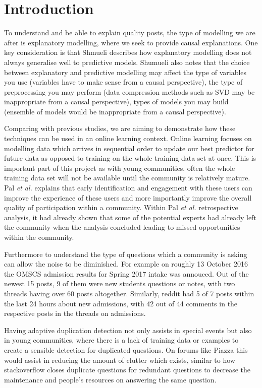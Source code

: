 \documentclass[journal,12pt,onecolumn,draftclsnofoot,]{IEEEtran}
\begin{document}
\section{Introduction}

To understand and be able to explain quality posts, the type of modelling we are after is explanatory modelling, where we seek to provide causal explanations. One key consideration is that Shmueli\cite{modpred} describes how explanatory modelling does not always generalise well to predictive models. Shumueli\cite{modpred} also notes that the choice between explanatory and predictive modelling may affect the type of variables you use (variables have to make sense from a causal perspective), the type of preprocessing you may perform (data compression methods such as SVD may be inappropriate from a causal perspective), types of models you may build (ensemble of models would be inappropriate from a causal perspective). 

Comparing with previous studies, we are aiming to demonstrate how these techniques can be used in an online learning context. Online learning focuses on modelling data which arrives in sequential order to update our best predictor for future data as opposed to training on the whole training data set at once. This is important part of this project as with young communities, often the whole training data set will not be available until the community is relatively mature. Pal \emph{et al.}\cite{pal} explains that early identification and engagement with these users  can improve the experience of these users and more importantly improve the overall quality of participation within a community. Within Pal \emph{et al.}\cite{pal} retrospective analysis, it had already shown that some of the potential experts had already left the community when the analysis concluded leading to missed opportunities within the community.

Furthermore to understand the type of questions which a community is asking can allow the noise to be diminished. For example on roughly 13 October 2016 the OMSCS admission results for Spring 2017 intake was annouced. Out of the newest 15 posts, 9 of them were new students questions or notes, with two threads having over 60 posts altogether. Similarly, reddit had 5 of 7 posts within the last 24 hours about new admissions, with 42 out of 44 comments in the respective posts in the threads on admissions.

Having adaptive duplication detection not only assists in special events but also in young communities, where there is a lack of training data or examples to create a sensible detection for duplicated questions. On forums like Piazza this would assist in reducing the amount of clutter which exists, similar to how stackoverflow closes duplicate questions for redundant questions to decrease the maintenance and people's resources on answering the same question. 
\end{document}

